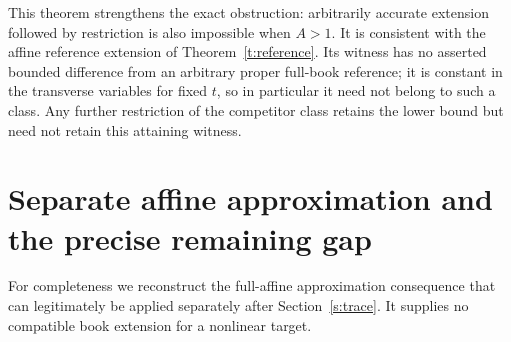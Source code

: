 \documentclass[11pt]{article}
\theoremstyle{definition}\newtheorem{definition}[theorem]{Definition}
\theoremstyle{remark}\newtheorem{remark}[theorem]{Remark}
\begin{document}
This theorem strengthens the exact obstruction: arbitrarily accurate extension followed by restriction is also impossible when $A>1$. It is consistent with the affine reference extension of Theorem~\ref{t:reference}. Its witness has no asserted bounded difference from an arbitrary proper full-book reference; it is constant in the transverse variables for fixed $t$, so in particular it need not belong to such a class. Any further restriction of the competitor class retains the lower bound but need not retain this attaining witness.

\section{Separate affine approximation and the precise remaining gap}\label{s:gaps}
For completeness we reconstruct the full-affine approximation consequence that can legitimately be applied separately after Section~\ref{s:trace}. It supplies no compatible book extension for a nonlinear target.
\end{document}
